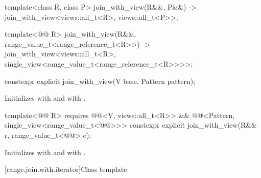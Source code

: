 \begin{codeblock}
{  template<class R, class P>
    join_with_view(R&&, P&&) -> join_with_view<views::all_t<R>, views::all_t<P>>;

  template<@@ R>
    join_with_view(R&&, range_value_t<range_reference_t<R>>)
      -> join_with_view<views::all_t<R>, single_view<range_value_t<range_reference_t<R>>>>;
}
\end{codeblock}

\begin{itemdecl}
constexpr explicit join_with_view(V base, Pattern pattern);
\end{itemdecl}

\begin{itemdescr}
\pnum
\effects
Initializes  with  and
 with .
\end{itemdescr}

\begin{itemdecl}
template<@@ R>
  requires @@<V, views::all_t<R>> &&
           @@<Pattern, single_view<range_value_t<@@>>>
constexpr explicit join_with_view(R&& r, range_value_t<@@> e);
\end{itemdecl}

\begin{itemdescr}
\pnum
\effects
Initializes  with  and
 with .
\end{itemdescr}

[range.join.with.iterator]{Class template }


